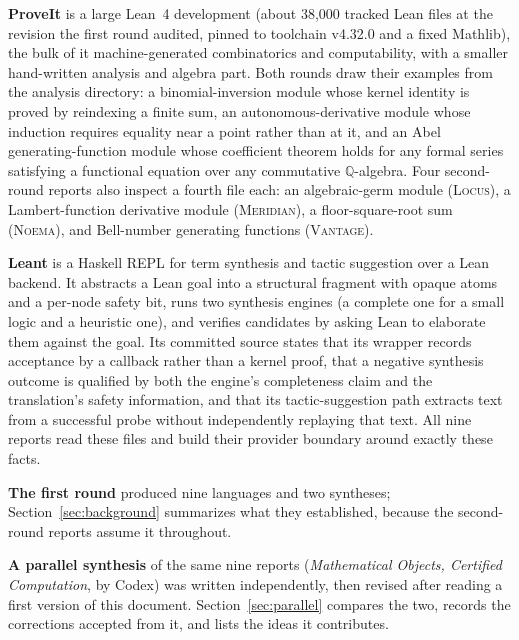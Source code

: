 \documentclass[11pt,a4paper]{article}
\newcommand{\code}[1]{\texttt{\detokenize{#1}}}
\newcommand{\Lc}{\textsc{Locus}}
\newcommand{\Md}{\textsc{Meridian}}
\newcommand{\Nm}{\textsc{Noema}}
\newcommand{\Vt}{\textsc{Vantage}}
\newcommand{\Q}{\mathbb Q}
\theoremstyle{definition}
\begin{document}
\textbf{ProveIt} is a large Lean~4 development (about 38,000 tracked Lean files at the revision the first round audited, pinned to toolchain v4.32.0 and a fixed Mathlib), the bulk of it machine-generated combinatorics and computability, with a smaller hand-written analysis and algebra part. Both rounds draw their examples from the analysis directory: a binomial-inversion module whose kernel identity is proved by reindexing a finite sum, an autonomous-derivative module whose induction requires equality near a point rather than at it, and an Abel generating-function module whose coefficient theorem holds for any formal series satisfying a functional equation over any commutative $\Q$-algebra. Four second-round reports also inspect a fourth file each: an algebraic-germ module (\Lc), a Lambert-function derivative module (\Md), a floor-square-root sum (\Nm), and Bell-number generating functions (\Vt).

\textbf{Leant} is a Haskell REPL for term synthesis and tactic suggestion over a Lean backend. It abstracts a Lean goal into a structural fragment with opaque atoms and a per-node safety bit, runs two synthesis engines (a complete one for a small logic and a heuristic one), and verifies candidates by asking Lean to elaborate them against the goal. Its committed source states that its \code{Verified} wrapper records acceptance by a callback rather than a kernel proof, that a negative synthesis outcome is qualified by both the engine's completeness claim and the translation's safety information, and that its tactic-suggestion path extracts \code{Try this} text from a successful probe without independently replaying that text. All nine reports read these files and build their provider boundary around exactly these facts.

\textbf{The first round} produced nine languages and two syntheses; Section~\ref{sec:background} summarizes what they established, because the second-round reports assume it throughout.

\textbf{A parallel synthesis} of the same nine reports (\emph{Mathematical Objects, Certified Computation}, by Codex) was written independently, then revised after reading a first version of this document. Section~\ref{sec:parallel} compares the two, records the corrections accepted from it, and lists the ideas it contributes.
\end{document}
